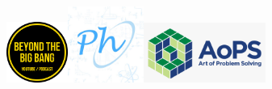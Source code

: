 \documentclass[11pt]{article}
\begin{document}
\begin{titlepage}
\begin{center}
    \includegraphics[width=2cm]{sponsors/btbb.png}\qquad\includegraphics[width=2.5cm]{sponsors/physolymp.jpg}\qquad\includegraphics[width=4cm]{sponsors/aops.png}
\end{center}
\end{titlepage}
\newpage
\end{document}
